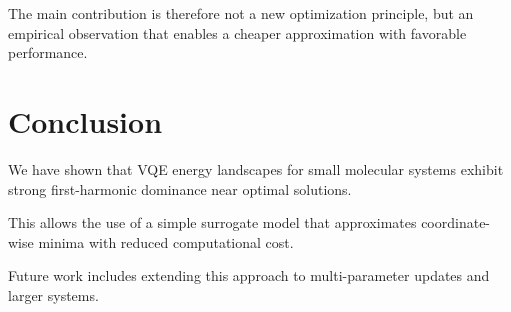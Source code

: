 \documentclass[12pt]{article}
\begin{document}
The main contribution is therefore not a new optimization principle, but an empirical observation that enables a cheaper approximation with favorable performance.


\section{Conclusion}

We have shown that VQE energy landscapes for small molecular systems exhibit strong first-harmonic dominance near optimal solutions.

This allows the use of a simple surrogate model that approximates coordinate-wise minima with reduced computational cost.

Future work includes extending this approach to multi-parameter updates and larger systems.




\end{document}
